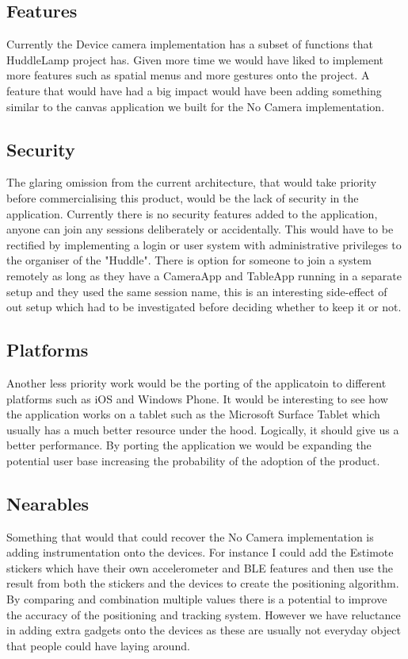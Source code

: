 \subsection{Features}
Currently the Device camera implementation has a subset of functions that HuddleLamp project has. Given more time we would have liked to implement more features such as spatial menus and more gestures onto the project. A feature that would have had a big impact would have been adding something similar to the canvas application we built for the No Camera implementation.

\subsection{Security}
The glaring omission from the current architecture, that would take priority before commercialising this product, would be the lack of security in the application. Currently there is no security features added to the application, anyone can join any sessions deliberately or accidentally. This would have to be rectified by implementing a login or user system with administrative privileges to the organiser of the "Huddle". There is option for someone to join a system remotely as long as they have a CameraApp and TableApp running in a separate setup and they used the same session name, this is an interesting side-effect of out setup which had to be investigated before deciding whether to keep it or not.

\subsection{Platforms}
Another less priority work would be the porting of the applicatoin to different platforms such as iOS and Windows Phone. It would be interesting to see how the application works on a tablet such as the Microsoft Surface Tablet which usually has a much better resource under the hood. Logically, it should give us a better performance. By porting the application we would be expanding the potential user base increasing the probability of the adoption of the product.

\subsection{Nearables}
Something that would that could recover the No Camera implementation is adding instrumentation onto the devices. For instance I could add the Estimote stickers which have their own accelerometer and BLE features and then use the result from both the stickers and the devices to create the positioning algorithm. By comparing and combination multiple values there is a potential to improve the accuracy of the positioning and tracking system. However we have reluctance in adding extra gadgets onto the devices as these are usually not everyday object that people could have laying around.